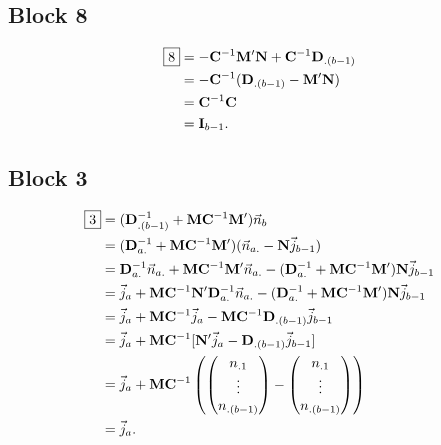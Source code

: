 \subsection*{Block 8}
\begin{align*}
    \boxed{8}
     & =-\mathbf{C}^{-1}\mathbf{M}'\mathbf{N}+\mathbf{C}^{-1}\mathbf{D}_{.(b-1)} \\
     & =-\mathbf{C}^{-1}(\mathbf{D}_{.(b-1)}-\mathbf{M}'\mathbf{N})              \\
     & =\mathbf{C}^{-1}\mathbf{C}                                                \\
     & =\mathbf{I}_{b-1}.
\end{align*}
\subsection*{Block 3}
\begin{align*}
    \boxed{3}
     & =(\mathbf{D}_{.(b-1)}^{-1}+\mathbf{M}\mathbf{C}^{-1}\mathbf{M}')\vec{n}_{b}                           \\
     & =(\mathbf{D}_{a.}^{-1}+\mathbf{M}\mathbf{C}^{-1}\mathbf{M}')(\vec{n}_{a.}-\mathbf{N}\vec{j}_{b-1}) \\
     & =\mathbf{D}_{a.}^{-1}\vec{n}_{a.}+\mathbf{M}\mathbf{C}^{-1}\mathbf{M}'\vec{n}_{a.}
    -(\mathbf{D}_{a.}^{-1}+\mathbf{M}\mathbf{C}^{-1}\mathbf{M}')\mathbf{N}\vec{j}_{b-1}                      \\
     & =\vec{j}_a+\mathbf{M}\mathbf{C}^{-1}\mathbf{N}'\mathbf{D}_{a.}^{-1}\vec{n}_{a.}
    -(\mathbf{D}_{a.}^{-1}+\mathbf{M}\mathbf{C}^{-1}\mathbf{M}')\mathbf{N}\vec{j}_{b-1}                      \\
     & =\vec{j}_a+\mathbf{M}\mathbf{C}^{-1}\vec{j}_a
    -\mathbf{M}\mathbf{C}^{-1}\mathbf{D}_{.(b-1)}\vec{j}_{b-1}                                               \\
     & =\vec{j}_a+\mathbf{M}\mathbf{C}^{-1}[\mathbf{N}'\vec{j}_a-\mathbf{D}_{.(b-1)}\vec{j}_{b-1}]     \\
     & =\vec{j}_a+\mathbf{M}\mathbf{C}^{-1}\left(\begin{pmatrix}
                                                            n_{.1} \\
                                                            \vdots \\
                                                            n_{.(b-1)}
                                                        \end{pmatrix}-\begin{pmatrix}
                                                                          n_{.1} \\
                                                                          \vdots \\
                                                                          n_{.(b-1)}
                                                                      \end{pmatrix}\right)                          \\
     & =\vec{j}_a.
\end{align*}
